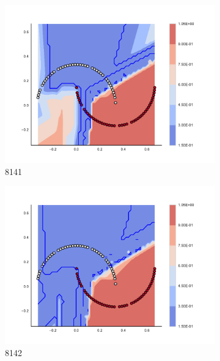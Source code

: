 \begin{figure}[h]
\begin{subfigure}[b]{0.09\textwidth}
    \includegraphics[clip, trim=2.35cm 1.75cm 4.5cm 0cm,width=\textwidth]{img/convergence/8141.pdf}
    \caption{8141}
    \label{fig:convergence_8141}
\end{subfigure}
%
\begin{subfigure}[b]{0.09\textwidth}
    \includegraphics[clip, trim=2.35cm 1.75cm 4.5cm 0cm,width=\textwidth]{img/convergence/8142.pdf}
    \caption{8142}
    \label{fig:convergence_8142}
\end{subfigure}
%
\begin{subfigure}[b]{0.09\textwidth}

\end{subfigure}
\end{figure}
